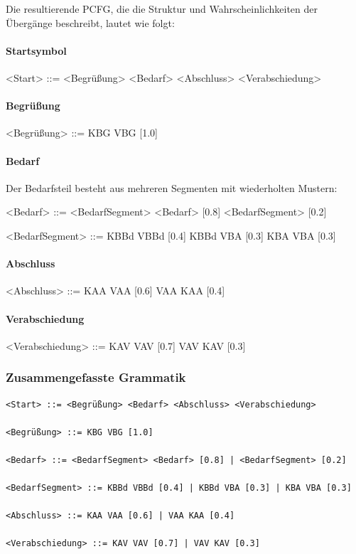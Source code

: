 \documentclass[
]{article}
\begin{document}
Die resultierende PCFG, die die Struktur und Wahrscheinlichkeiten der Übergänge beschreibt, lautet wie folgt:

\paragraph{Startsymbol}

\textless Start\textgreater{} ::= \textless Begrüßung\textgreater{} \textless Bedarf\textgreater{} \textless Abschluss\textgreater{} \textless Verabschiedung\textgreater{}

\paragraph{Begrüßung}

\textless Begrüßung\textgreater{} ::= KBG VBG [1.0]

\paragraph{Bedarf}

Der Bedarfsteil besteht aus mehreren Segmenten mit wiederholten Mustern:

\textless Bedarf\textgreater{} ::= \textless BedarfSegment\textgreater{} \textless Bedarf\textgreater{} [0.8] \textbar{} \textless BedarfSegment\textgreater{} [0.2]

\textless BedarfSegment\textgreater{} ::= KBBd VBBd [0.4] \textbar{} KBBd VBA [0.3] \textbar{} KBA VBA [0.3]

\paragraph{Abschluss}

\textless Abschluss\textgreater{} ::= KAA VAA [0.6] \textbar{} VAA KAA [0.4]

\paragraph{Verabschiedung}

\textless Verabschiedung\textgreater{} ::= KAV VAV [0.7] \textbar{} VAV KAV [0.3]

\subsubsection{Zusammengefasste Grammatik}\label{zusammengefasste-grammatik}

\begin{verbatim}
<Start> ::= <Begrüßung> <Bedarf> <Abschluss> <Verabschiedung>

<Begrüßung> ::= KBG VBG [1.0]

<Bedarf> ::= <BedarfSegment> <Bedarf> [0.8] | <BedarfSegment> [0.2]

<BedarfSegment> ::= KBBd VBBd [0.4] | KBBd VBA [0.3] | KBA VBA [0.3]

<Abschluss> ::= KAA VAA [0.6] | VAA KAA [0.4]

<Verabschiedung> ::= KAV VAV [0.7] | VAV KAV [0.3]
\end{verbatim}
\end{document}
